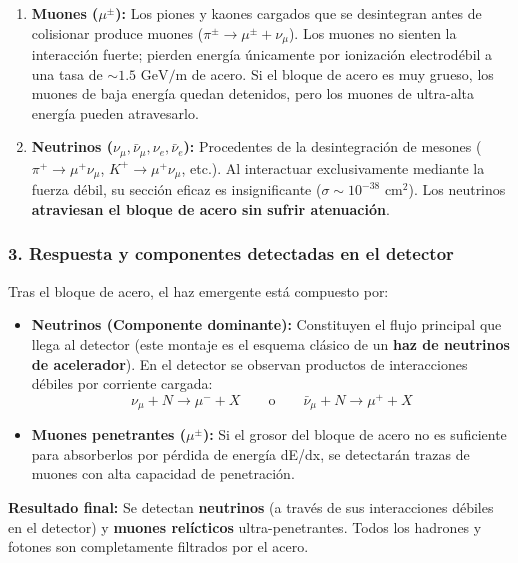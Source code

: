 \begin{problema}
\begin{enumerate}[label=\arabic*.]
    \item \textbf{Muones ($\mu^\pm$):} Los piones y kaones cargados que se desintegran antes de colisionar produce muones ($\pi^\pm \to \mu^\pm + \nu_\mu$). Los muones no sienten la interacción fuerte; pierden energía únicamente por ionización electrodébil a una tasa de $\sim 1.5\text{ GeV/m}$ de acero. Si el bloque de acero es muy grueso, los muones de baja energía quedan detenidos, pero los muones de ultra-alta energía pueden atravesarlo.

    \item \textbf{Neutrinos ($\nu_\mu, \bar{\nu}_\mu, \nu_e, \bar{\nu}_e$):} Procedentes de la desintegración de mesones ($\pi^+ \to \mu^+ \nu_\mu$, $K^+ \to \mu^+ \nu_\mu$, etc.). Al interactuar exclusivamente mediante la fuerza débil, su sección eficaz es insignificante ($\sigma \sim 10^{-38}\text{ cm}^2$). Los neutrinos \textbf{atraviesan el bloque de acero sin sufrir atenuación}.
\end{enumerate}

\subsubsection*{3. Respuesta y componentes detectadas en el detector}

Tras el bloque de acero, el haz emergente está compuesto por:
\begin{itemize}
    \item \textbf{Neutrinos (Componente dominante):} Constituyen el flujo principal que llega al detector (este montaje es el esquema clásico de un \textbf{haz de neutrinos de acelerador}). En el detector se observan productos de interacciones débiles por corriente cargada:
    \begin{equation*}
    \nu_\mu + N \longrightarrow \mu^- + X \qquad \text{o} \qquad \bar{\nu}_\mu + N \longrightarrow \mu^+ + X
    \end{equation*}
    \item \textbf{Muones penetrantes ($\mu^\pm$):} Si el grosor del bloque de acero no es suficiente para absorberlos por pérdida de energía dE/dx, se detectarán trazas de muones con alta capacidad de penetración.
\end{itemize}

\textbf{Resultado final:} Se detectan \textbf{neutrinos} (a través de sus interacciones débiles en el detector) y \textbf{muones relícticos} ultra-penetrantes. Todos los hadrones y fotones son completamente filtrados por el acero.
\newpage
\end{problema}

